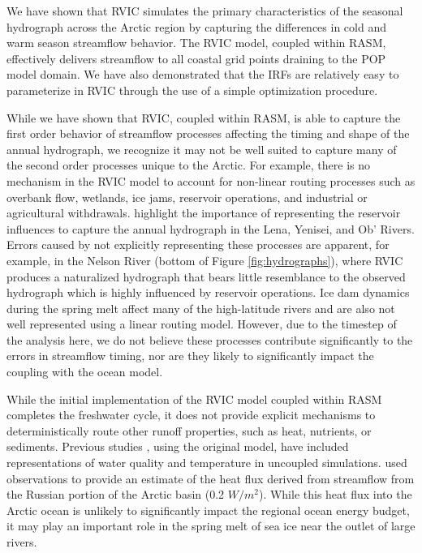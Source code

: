 \documentclass[jgrga, draft]{agutex}
\begin{document}
\begin{article}
We have shown that RVIC simulates the primary characteristics of the seasonal hydrograph across the Arctic region by capturing the differences in cold and warm season streamflow behavior.
The RVIC model, coupled within RASM, effectively delivers streamflow to all coastal grid points draining to the POP model domain.
We have also demonstrated that the IRFs are relatively easy to parameterize in RVIC through the use of a simple optimization procedure.

While we have shown that RVIC, coupled within RASM, is able to capture the first order behavior of streamflow processes affecting the timing and shape of the annual hydrograph, we recognize it may not be well suited to capture many of the second order processes unique to the Arctic.
For example, there is no mechanism in the RVIC model to account for non-linear routing processes such as overbank flow, wetlands, ice jams, reservoir operations, and industrial or agricultural withdrawals.
\citet{Adam_2007} highlight the importance of representing the reservoir influences to capture the annual hydrograph in the Lena, Yenisei, and Ob' Rivers.
Errors caused by not explicitly representing these processes are apparent, for example, in the Nelson River (bottom of Figure \ref{fig:hydrographs}), where RVIC produces a naturalized hydrograph that bears little resemblance to the observed hydrograph which is highly influenced by reservoir operations.
Ice dam dynamics during the spring melt affect many of the high-latitude rivers and are also not well represented using a linear routing model.
However, due to the timestep of the analysis here, we do not believe these processes contribute significantly to the errors in streamflow timing, nor are they likely to significantly impact the coupling with the ocean model.

While the initial implementation of the RVIC model coupled within RASM completes the freshwater cycle, it does not provide explicit mechanisms to deterministically route other runoff properties, such as heat, nutrients, or sediments.
Previous studies \citep[e.g.][]{vanVliet_2011,vanVliet_2012}, using the original \citet{Lohmann_1996} model, have included representations of water quality and temperature in uncoupled simulations.
\citet{Lammers_2007} used observations to provide an estimate of the heat flux derived from streamflow from the Russian portion of the Arctic basin (0.2 $W/m^2$).
While this heat flux into the Arctic ocean is unlikely to significantly impact the regional ocean energy budget, it may play an important role in the spring melt of sea ice near the outlet of large rivers.


\end{article}
\end{document}
